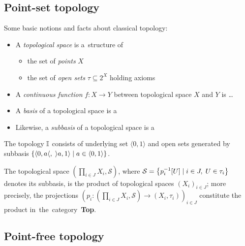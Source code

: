 \subsection*{Point-set topology}

Some basic notions and facts about classical topology:

\begin{itemize}
\item A \emph{topological space} is a~structure of
  \begin{itemize}
  \item the set of \emph{points\/} $X$
  \item the set of \emph{open sets\/} $\tau\subseteq 2^X$ holding axioms
  \end{itemize}

\item A \emph{continuous function} $f\colon X \to Y$ between topological space
$X$ and $Y$ is \ldots
\item A \emph{basis} of a topological space is a
\item Likewise, a \emph{subbasis} of a topological space is a
\end{itemize}

\begin{exmpl}
  The topology $\mathbb{I}$ consists of underlying set $\langle 0, 1 \rangle$ and open
  sets generated by subbasis $\{ \langle 0, a \langle, \; \rangle a, 1 \rangle
  \mid a\in \langle 0, 1 \rangle \}$.
\end{exmpl}

\begin{fact}
  The topological space $\left( \prod_{i\in J} X_i, \mathcal{S} \right)$, where
  $\mathcal{S} = \left\{ p_{i}^{-1}[U] \mid i\in J, \; U\in \tau_i \right\}$
  denotes its subbasis, is the product of topological spaces $\left( X_i
  \right)_{i\in J}$;
  more precisely, the projections $\left( p_i\colon \left(\prod_{i\in J} X_i,
  \mathcal{S}\right) \to \left(X_i, \tau_i\right) \right)_{i\in J}$
  constitute the product in~the~category~{\bf Top}.
\end{fact}

\subsection*{Point-free topology}

